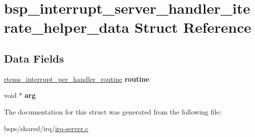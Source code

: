 \hypertarget{structbsp__interrupt__server__handler__iterate__helper__data}{}\section{bsp\+\_\+interrupt\+\_\+server\+\_\+handler\+\_\+iterate\+\_\+helper\+\_\+data Struct Reference}
\label{structbsp__interrupt__server__handler__iterate__helper__data}
\subsection*{Data Fields}
\begin{DoxyCompactItemize}
\item 
\mbox{\label{structbsp__interrupt__server__handler__iterate__helper__data_a9dc4eeb88f58100149aec270f028a93b}} 
\mbox{\hyperlink{group__rtems__interrupt__extension_gad3e88a9acfac97a5021ff98471f5cd71}{rtems\+\_\+interrupt\+\_\+per\+\_\+handler\+\_\+routine}} {\bfseries routine}
\item 
\mbox{\label{structbsp__interrupt__server__handler__iterate__helper__data_abaa783b321b2b9c7cab75c35b6f871d1}} 
void $\ast$ {\bfseries arg}
\end{DoxyCompactItemize}


The documentation for this struct was generated from the following file\+:\begin{DoxyCompactItemize}
\item 
bsps/shared/irq/\mbox{\hyperlink{irq-server_8c}{irq-\/server.\+c}}\end{DoxyCompactItemize}
